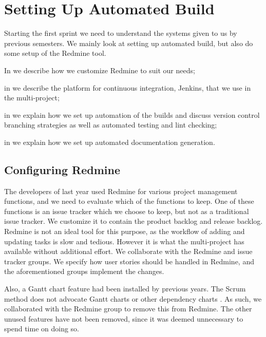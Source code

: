 \chapter{Setting Up Automated Build}\label{chap:config_management}
Starting the first sprint we need to understand the systems given to us by previous semesters. We mainly look at setting up automated build, but also do some setup of the Redmine tool.

\begin{chapterorganization}
  \item In  we describe how we customize Redmine to suit our needs;
  \item in  we describe the platform for continuous integration, Jenkins, that we use in the multi-project;
  \item in  we explain how we set up automation of the builds and discuss version control branching strategies as well as automated testing and lint checking;
  \item in  we explain how we set up automated documentation generation.
\end{chapterorganization}

\section{Configuring Redmine}\label{sec:redmine-conf}
The developers of last year used Redmine for various project management functions, and we need to evaluate which of the functions to keep. One of these functions is an issue tracker which we choose to keep, but not as a traditional issue tracker. We customize it to contain the product backlog and release backlog. Redmine is not an ideal tool for this purpose, as the workflow of adding and updating tasks is slow and tedious. However it is what the multi-project has available without additional effort. We collaborate with the Redmine and issue tracker groups. We specify how user stories should be handled in Redmine, and the aforementioned groups implement the changes.

Also, a Gantt chart feature had been installed by previous years. The Scrum method does not advocate Gantt charts or other dependency charts \parencite{larman2003}. As such, we collaborated with the Redmine group to remove this from Redmine. The other unused features have not been removed, since it was deemed unnecessary to spend time on doing so.

